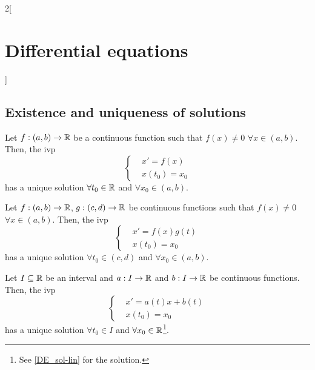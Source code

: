 \documentclass[../../../main.tex]{subfiles}
\begin{document}
\begin{multicols}{2}[\section{Differential equations}]
    \subsection{Existence and uniqueness of solutions}
    \begin{prop}
        Let $f:(a,b)\rightarrow\mathbb{R}$ be a continuous function such that $f(x)\ne 0$ $\forall x\in(a,b)$. Then, the ivp
        $$
            \left\{
            \begin{aligned}
                 & x'      =f(x) \\
                 & x(t_0)  =x_0
            \end{aligned}
            \right.
        $$
        has a unique solution $\forall t_0\in\mathbb{R}$ and $\forall x_0\in(a,b)$.
    \end{prop}
    \begin{prop}
        Let $f:(a,b)\rightarrow\mathbb{R}$, $g:(c,d)\rightarrow\mathbb{R}$ be continuous functions such that $f(x)\ne 0$ $\forall x\in(a,b)$. Then, the ivp
        $$\left\{
            \begin{aligned}
                 & x'      =f(x)g(t) \\
                 & x(t_0)  =x_0
            \end{aligned}
            \right.$$
        has a unique solution $\forall t_0\in(c,d)$ and $\forall x_0\in(a,b)$.
    \end{prop}
    \begin{prop}
        Let $I\subseteq\mathbb{R}$ be an interval and $a:I\rightarrow\mathbb{R}$ and $b:I\rightarrow\mathbb{R}$ be continuous functions. Then, the ivp
        $$\left\{
            \begin{aligned}
                 & x'      =a(t)x+b(t) \\
                 & x(t_0)  =x_0
            \end{aligned}
            \right.$$
        has a unique solution $\forall t_0\in I$ and $\forall x_0\in\mathbb{R}$\footnote{See \cref{DE_sol-lin} for the solution.}.
    \end{prop}

\end{multicols}
\end{document}
